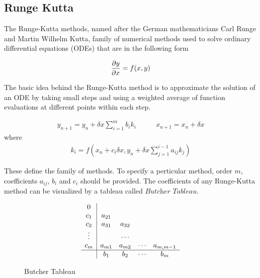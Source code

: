 \documentclass[a4paper,oneside,12pt]{report}
\numberwithin{equation}{chapter}
\begin{document}
\subsection{Runge Kutta}

The Runge-Kutta methods, named after the German mathematicians Carl Runge and Martin Wilhelm Kutta, family of numerical methods
used to solve ordinary differential equations (ODEs) that are in the following form

\begin{equation} \label{eq:first-order-ODE}
    \frac{\partial y}{\partial x} = f(x, y)
\end{equation}


The basic idea behind the Runge-Kutta method is to approximate the solution of an ODE by taking small steps and using a weighted average 
of function evaluations at different points within each step.

\begin{equation} \label{eq:general-rk}
    \begin{aligned}
        y_{n+1} = y_n + \delta x \sum_{i=1}^{m} b_i k_i
    \end{aligned}
    \qquad
    \begin{aligned}
        x_{n+1} = x_n + \delta x 
    \end{aligned}
\end{equation}
where 
\begin{eqnarray} \label{eq:general-rk-coef}
    k_i = f(x_n + c_i \delta x, y_n + \delta x \sum_{j = 1}^{i - 1}a_{ij}k_j)
\end{eqnarray}

These  define the family of methods. To specify a perticular method, order $m$, coefficients $a_{ij}$, $b_i$ and $c_i$ should be provided.
The coefficients of any Runge-Kutta method can be visualized by a tableau called $\textit{Butcher Tableau}$.

\begin{figure}[h!]
    \[ 
    \begin{array} 
        {c|cccc}
        0\\
        c_1 & a_{21} \\
        c_2 & a_{31} & a_{32}\\
        \vdots& & \cdots& \\
        c_m & a_{m1} & a_{m2} & \cdots & a_{m,m-1}\\
        \hline
        & b_1 & b_2 &\cdots & b_m
    \end{array}
    \]
    \caption{Butcher Tableau}
    \label{fig:Butcher}
\end{figure}
\end{document}
